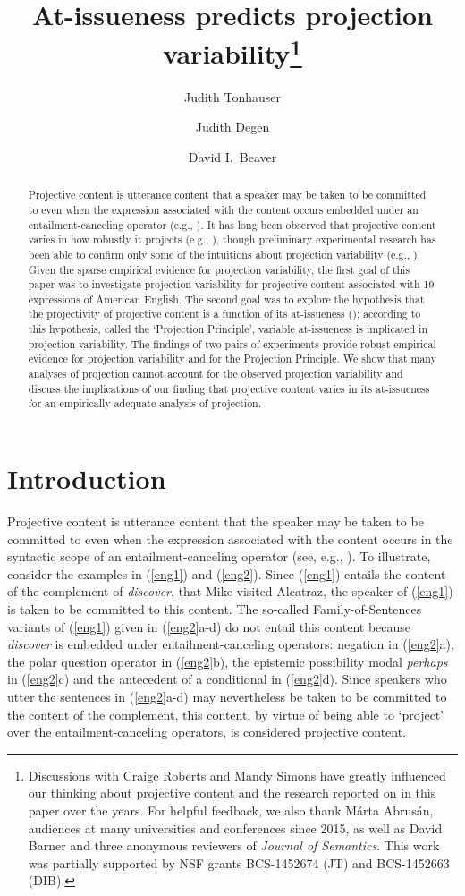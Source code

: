 \documentclass[11pt,fleqn]{article}
\title{At-issueness predicts projection variability\thanks{Discussions with Craige Roberts and Mandy Simons have greatly influenced our thinking about projective content and the research reported on in this paper over the years. For helpful feedback, we also thank M\'arta Abrus\'an, audiences at many universities and conferences since 2015, as well as David Barner and three anonymous reviewers of {\em Journal of Semantics}. This work was partially supported by NSF grants BCS-1452674 (JT) and BCS-1452663 (DIB).}}
\author[$\bullet$]{Judith Tonhauser}
\author[$\triangleright$]{Judith Degen}
\author[$\circ$]{David I.\ Beaver}
\affil[$\bullet$]{The Ohio State University}
\affil[$\triangleright$]{Stanford University}
\affil[$\circ$]{University of Texas at Austin}
\newcommand{\6}{\mbox{$[\hspace*{-.6mm}[$}}
\newcommand{\9}{\mbox{$]\hspace*{-.6mm}]$}}
\begin{document}
\maketitle

\begin{abstract}
Projective content is utterance content that a speaker may be taken to be committed to even when the expression associated with the content occurs embedded under an entailment-canceling operator (e.g., \citealt{ccmg90}). It has long been observed that projective content varies in how robustly it projects (e.g., \citealt{karttunen71b,simons01,abusch10}), though preliminary experimental research has been able to confirm only some of the intuitions about projection variability (e.g., \citealt{xue-onea11,smith-hall11}). Given the sparse empirical evidence for projection variability, the first goal of this paper was to investigate projection variability for projective content associated with 19 expressions of American English. The second goal was to explore the hypothesis that the projectivity of projective content is a function of its at-issueness (\citealt{brst-salt10,brst-ar}); according to this hypothesis, called the `Projection Principle', variable at-issueness is implicated in projection variability. The findings of two pairs of experiments provide robust empirical evidence for projection variability and for the Projection Principle. We show that many analyses of projection  cannot account for the observed projection variability and discuss the implications of our finding that projective content varies in its at-issueness for an empirically adequate analysis of projection.

\end{abstract}


			
\section{Introduction}\label{s1}

Projective content is utterance content that the speaker may be taken to be committed to even when the expression associated with the content occurs in the syntactic scope of an entailment-canceling operator (see, e.g., \citealt{ccmg90}). To illustrate, consider the examples in (\ref{eng1}) and (\ref{eng2}). Since (\ref{eng1}) entails the content of the complement of {\em discover}, that Mike visited Alcatraz, the speaker of (\ref{eng1}) is taken to be committed to this content. The so-called Family-of-Sentences variants of (\ref{eng1}) given in (\ref{eng2}a-d) do not entail this content because {\em discover} is embedded under entailment-canceling operators: negation in (\ref{eng2}a), the polar question operator in (\ref{eng2}b), the epistemic possibility modal {\em perhaps} in (\ref{eng2}c) and the antecedent of a conditional in (\ref{eng2}d). Since speakers who utter the sentences in (\ref{eng2}a-d) may nevertheless be taken to be committed to the content of the complement, this content, by virtue of being able to `project' over the entailment-canceling operators, is considered projective content. 
\end{document}
